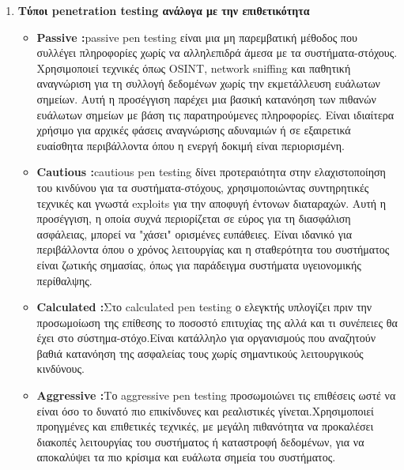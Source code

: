 {\begin{enumerate}
\begin{itemize}
    \end{itemize}
    \item{\textbf{ Τύποι \lt penetration testing \gt ανάλογα με την επιθετικότητα}}
    \begin{itemize}
        \item \textbf{\lt Passive :} \lt passive pen testing \gt  είναι μια μη παρεμβατική μέθοδος που συλλέγει πληροφορίες χωρίς να αλληλεπιδρά άμεσα με τα συστήματα-στόχους. Χρησιμοποιεί τεχνικές όπως \lt OSINT, network sniffing \gt και παθητική αναγνώριση για τη συλλογή δεδομένων χωρίς την εκμετάλλευση ευάλωτων σημείων. Αυτή η προσέγγιση παρέχει μια βασική κατανόηση των πιθανών ευάλωτων σημείων με βάση τις παρατηρούμενες πληροφορίες. Είναι ιδιαίτερα χρήσιμο για αρχικές φάσεις αναγνώρισης αδυναμιών ή σε εξαιρετικά ευαίσθητα περιβάλλοντα όπου η ενεργή δοκιμή είναι περιορισμένη.
        \item \textbf{\lt Cautious :} \lt cautious pen testing \gt δίνει προτεραιότητα στην ελαχιστοποίηση του κινδύνου για τα συστήματα-στόχους, χρησιμοποιώντας συντηρητικές τεχνικές και γνωστά \lt exploits \gt για την αποφυγή έντονων διαταραχών. Αυτή η προσέγγιση, η οποία συχνά περιορίζεται σε εύρος για τη διασφάλιση ασφάλειας, μπορεί να "χάσει" ορισμένες ευπάθειες. Είναι ιδανικό για περιβάλλοντα όπου ο χρόνος λειτουργίας και η σταθερότητα του συστήματος είναι ζωτικής σημασίας, όπως για παράδειγμα συστήματα υγειονομικής περίθαλψης.
        \item \textbf{\lt Calculated :}\gt Στο \lt calculated pen testing \gt ο ελεγκτής υπλογίζει πριν την προσωμοίωση της επίθεσης το ποσοστό επιτυχίας της αλλά και τι συνέπειες θα έχει στο σύστημα-στόχο.Είναι κατάλληλο για οργανισμούς που αναζητούν βαθιά κατανόηση της ασφαλείας τους χωρίς σημαντικούς λειτουργικούς κινδύνους.
        \item \textbf{\lt Aggressive :}\gt Το \lt aggressive pen testing \gt προσωμοιώνει τις επιθέσεις ωστέ να είναι όσο το δυνατό πιο επικίνδυνες και ρεαλιστικές γίνεται.Χρησιμοποιεί προηγμένες και επιθετικές τεχνικές, με μεγάλη πιθανότητα να προκαλέσει διακοπές λειτουργίας του συστήματος ή καταστροφή δεδομένων, για να αποκαλύψει τα πιο κρίσιμα και ευάλωτα σημεία του συστήματος.
        

\end{itemize}
\end{enumerate}}
